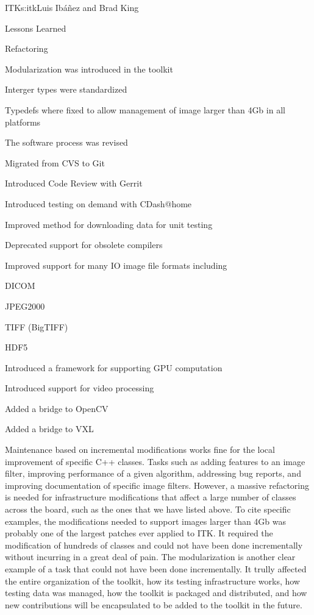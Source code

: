 \begin{aosachapter}{ITK}{s:itk}{Luis Ib\'{a}\~{n}ez and Brad King}
\begin{aosasect1}{Lessons Learned}
\begin{aosasect2}{Refactoring}
\begin{aosaitemize}
\item Modularization was introduced in the toolkit
\item Interger types were standardized
\item Typedefs where fixed to allow management of image larger than 4Gb in all platforms
\item The software process was revised
  \begin{aosaitemize2}
    \item Migrated from CVS to Git
    \item Introduced Code Review with Gerrit
    \item Introduced testing on demand with CDash@home
    \item Improved method for downloading data for unit testing
  \end{aosaitemize2}
\item Deprecated support for obsolete compilers
\item Improved support for many IO image file formats including
  \begin{aosaitemize2}
    \item DICOM
    \item JPEG2000
    \item TIFF (BigTIFF)
    \item HDF5
  \end{aosaitemize2}
\item Introduced a framework for supporting GPU computation
\item Introduced support for video processing
  \begin{aosaitemize2}
    \item Added a bridge to OpenCV
    \item Added a bridge to VXL
  \end{aosaitemize2}

\end{aosaitemize}

Maintenance based on incremental modifications works fine for the
local improvement of specific C++ classes. Tasks such as adding
features to an image filter, improving performance of a given
algorithm, addressing bug reports, and improving documentation of
specific image filters. However, a massive refactoring is needed for
infrastructure modifications that affect a large number of classes
across the board, such as the ones that we have listed above. To cite
specific examples, the modifications needed to support images larger
than 4Gb was probably one of the largest patches ever applied to ITK.
It required the modification of hundreds of classes and could not have
been done incrementally without incurring in a great deal of pain. The
modularization is another clear example of a task that could not have
been done incrementally. It trully affected the entire organization of
the toolkit, how its testing infrastructure works, how testing data
was managed, how the toolkit is packaged and distributed, and how new
contributions will be encapsulated to be added to the toolkit in the
future.


\end{aosasect2}
\end{aosasect1}
\end{aosachapter}
